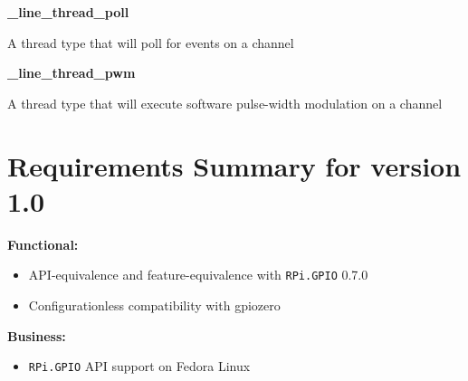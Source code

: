 \documentclass[12pt]{article}
\begin{document}
\noindent \textbf{\_line\_thread\_poll}

A thread type that will poll for events on a channel

\noindent \textbf{\_line\_thread\_pwm}

A thread type that will execute software pulse-width modulation on a channel

\section{Requirements Summary for version 1.0}

\noindent \textbf{Functional:}
\begin{itemize}
    \item API-equivalence and feature-equivalence with \texttt{RPi.GPIO} 0.7.0 \cite{rpigpio}
    \item Configurationless compatibility with gpiozero \cite{gpiozero}
\end{itemize}

\noindent \textbf{Business:}
\begin{itemize}
    \item \texttt{RPi.GPIO} API support on Fedora Linux
\end{itemize}




\end{document}
